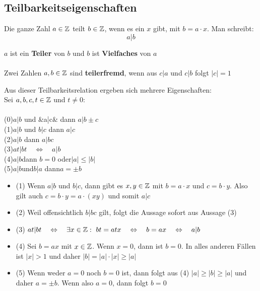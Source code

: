 	\subsection{Teilbarkeitseigenschaften}

\begin{Definition}
Die ganze Zahl $a\in\mathbb{Z}$ teilt $b\in\mathbb{Z}$, wenn es ein $x$ gibt, mit $b=a\cdot x$. Man schreibt:
$$a|b$$

$a$ ist ein \textbf{Teiler} von $b$ und $b$ ist \textbf{Vielfaches} von $a$\\\\

Zwei Zahlen $a,b\in\mathbb{Z}$  sind \textbf{teilerfremd}, wenn aus $ c | a  $ und $c|b$ folgt $|c|=1$
\end{Definition}

\begin{Theorem}
Aus dieser Teilbarkeitsrelation ergeben sich mehrere Eigenschaften:\\
Sei $a,b,c,t\in\mathbb{Z}$ und $t\neq0$:\\\\
(0)\qquad$a|b$ \quad und \quad&a|c& \quad dann \quad $a|b\pm c $\\
(1)\qquad$a|b$ \quad und \quad$b|c$ \quad dann \quad $a|c$\\
(2)\qquad$a|b$ \quad dann \quad $a|bc$\\
(3)\qquad$at|bt\quad\Leftrightarrow\quad a|b$\\
(4)\qquad$a|b$\quad dann \quad $b=0$ \quad oder\quad $|a| \leq |b| $\\
(5)\qquad$a|b$\quad und\quad $b|a$ \quad dann\quad $a=\pm b$
\end{Theorem}

\begin{Beweis}
\begin{itemize}
\item (1) \quad Wenn $a|b$ und $b|c$, dann gibt es $x,y\in\mathbb{Z}$ mit $b=a\cdot x$ und $c=b\cdot y$. Also gilt auch $c=b\cdot y=a\cdot(xy)$ und somit $a|c$\\
\item (2) \quad Weil offensichtlich $b|bc$ gilt, folgt die Aussage sofort aus Aussage (3) \\
\item (3)  \quad $at|bt\quad \Leftrightarrow\quad \exists x \in \mathbb{Z} : \, \, bt=atx \quad\Leftrightarrow \quad b=ax \quad\Leftrightarrow \quad a|b$ \\
\item (4) \quad Sei $b=ax$ mit $x\in\mathbb{Z}$. Wenn $x=0$, dann ist $b=0$. In alles anderen Fällen ist $|x|>1$ und daher $|b| = |a| \cdot |x| \geq |a|$
\item (5) \quad Wenn weder $a=0$ noch $b=0$ ist, dann folgt aus (4) $|a|\geq|b|\geq|a|$ und daher $a=\pm b$. Wenn also  $a=0$, dann folgt $b=0$
\end{itemize}
\end{Beweis}

